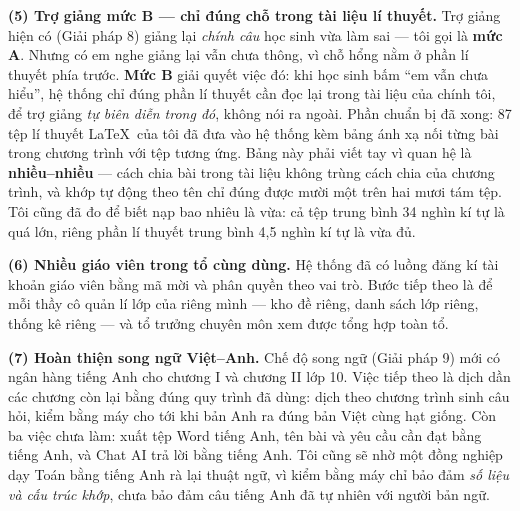 \textbf{(5) Trợ giảng mức B --- chỉ đúng chỗ trong tài liệu lí thuyết.} Trợ giảng
hiện có (Giải pháp 8) giảng lại \textit{chính câu} học sinh vừa làm sai --- tôi
gọi là \textbf{mức A}. Nhưng có em nghe giảng lại vẫn chưa thông, vì chỗ hổng nằm
ở phần lí thuyết phía trước. \textbf{Mức B} giải quyết việc đó: khi học sinh bấm
``em vẫn chưa hiểu'', hệ thống chỉ đúng phần lí thuyết cần đọc lại trong tài liệu
của chính tôi, để trợ giảng \textit{tự biên diễn trong đó}, không nói ra ngoài.
Phần chuẩn bị đã xong: 87 tệp lí thuyết \LaTeX\ của tôi đã đưa vào hệ thống kèm
bảng ánh xạ nối từng bài trong chương trình với tệp tương ứng. Bảng này phải viết
tay vì quan hệ là \textbf{nhiều--nhiều} --- cách chia bài trong tài liệu không
trùng cách chia của chương trình, và khớp tự động theo tên chỉ đúng được mười một
trên hai mươi tám tệp. Tôi cũng đã đo để biết nạp bao nhiêu là vừa: cả tệp trung
bình 34 nghìn kí tự là quá lớn, riêng phần lí thuyết trung bình 4{,}5 nghìn kí
tự là vừa đủ.

\textbf{(6) Nhiều giáo viên trong tổ cùng dùng.} Hệ thống đã có luồng đăng kí
tài khoản giáo viên bằng mã mời và phân quyền theo vai trò. Bước tiếp theo là để
mỗi thầy cô quản lí lớp của riêng mình --- kho đề riêng, danh sách lớp riêng,
thống kê riêng --- và tổ trưởng chuyên môn xem được tổng hợp toàn tổ.

\textbf{(7) Hoàn thiện song ngữ Việt--Anh.} Chế độ song ngữ (Giải pháp 9) mới có
ngân hàng tiếng Anh cho chương I và chương II lớp 10. Việc tiếp theo là dịch dần
các chương còn lại bằng đúng quy trình đã dùng: dịch theo chương trình sinh câu
hỏi, kiểm bằng máy cho tới khi bản Anh ra đúng bản Việt cùng hạt giống. Còn ba việc
chưa làm: xuất tệp Word tiếng Anh, tên bài và yêu cầu cần đạt bằng tiếng Anh, và
Chat AI trả lời bằng tiếng Anh. Tôi cũng sẽ nhờ một đồng nghiệp dạy Toán bằng tiếng
Anh rà lại thuật ngữ, vì kiểm bằng máy chỉ bảo đảm \textit{số liệu và cấu trúc
khớp}, chưa bảo đảm câu tiếng Anh đã tự nhiên với người bản ngữ.

\bigskip
